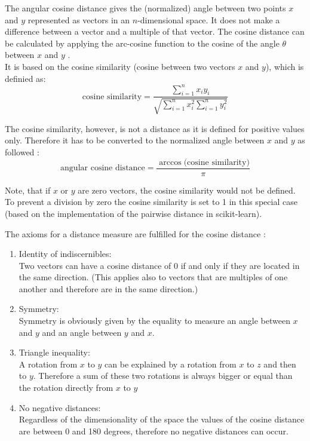 The angular cosine distance gives the (normalized) angle between two points $x$ and $y$ represented as vectors in an $n$-dimensional space. It does not make a difference between a vector and a multiple of that vector. The cosine distance can be calculated by applying the arc-cosine function to the cosine of the angle $\theta$ between $x$ and $y$ \cite{MMDS}. \\
It is based on the cosine similarity (cosine between two vectors $x$ and $y$), which is definied as: \\

\begin{equation}
	\text{cosine similarity} = \frac{\sum_{i=1}^{n} x_i y_i}{\sqrt{\sum_{i=1}^{n} x_i^2 \sum_{i=1}^{n} y_i^2}}
\end{equation}  

The cosine similarity, however, is not a distance as it is defined for positive values only. Therefore it has to be converted to the normalized angle between $x$ and $y$ as followed \cite{cosdist}: \\

\begin{equation}
	\text{angular cosine distance} = \frac{\arccos({\text{cosine similarity})}}{\pi}
\end{equation}  

Note, that if $x$ or $y$ are zero vectors, the cosine similarity would not be defined. To prevent a division by zero the cosine similarity is set to 1 in this special case (based on the implementation of the pairwise distance in scikit-learn). 

The axioms for a distance measure are fulfilled for the cosine distance \cite{MMDS}: \\

\begin{enumerate}
	\item Identity of indiscernibles:\\
	Two vectors can have a cosine distance of 0 if and only if they are located in the same direction. (This applies also to vectors that are multiples of one another and therefore are in the same direction.) 
	\item Symmetry: \\
	Symmetry is obviously given by the equality to measure an angle between $x$ and $y$ and an angle between $y$ and $x$. 
	\item Triangle inequality: \\
	A rotation from $x$ to $y$ can be explained by a rotation from $x$ to $z$ and then to $y$. Therefore a sum of these two rotations is always bigger or equal than the rotation directly from $x$ to $y$ 
	\item No negative distances:\\
	Regardless of the dimensionality of the space the values of the cosine distance are between 0 and 180 degrees, therefore no negative distances can occur. 
	
\end{enumerate}

